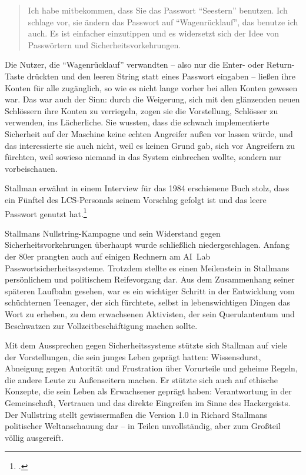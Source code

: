 \begin{quote}
Ich habe mitbekommen, dass Sie das Passwort "`Seestern"' benutzen. Ich schlage vor, sie ändern das Passwort auf "`Wagenrücklauf"', das benutze ich auch. Es ist einfacher einzutippen und es widersetzt sich der Idee von Passwörtern und Sicherheitsvorkehrungen.
\end{quote}

Die Nutzer, die "`Wagenrücklauf"' verwandten – also nur die Enter- oder Return-Taste drückten und den leeren String statt eines Passwort eingaben – ließen ihre Konten für alle zugänglich, so wie es nicht lange vorher bei allen Konten gewesen war. Das war auch der Sinn: durch die Weigerung, sich mit den glänzenden neuen Schlössern ihre Konten zu verriegeln, zogen sie die Vorstellung, Schlösser zu verwenden, ins Lächerliche. Sie wussten, dass die schwach implementierte Sicherheit auf der Maschine keine echten Angreifer außen vor lassen würde, und das interessierte sie auch nicht, weil es keinen Grund gab, sich vor Angreifern zu fürchten, weil sowieso niemand in das System einbrechen wollte, sondern nur vorbeischauen.

Stallman erwähnt in einem Interview für das 1984 erschienene Buch  stolz, dass ein Fünftel des LCS-Personals seinem Vorschlag gefolgt ist und das leere Passwort genutzt hat.\footcite[Vgl.][S.\,417]{hackers}

Stallmans Nullstring-Kampagne und sein Widerstand gegen Sicherheitsvorkehrungen überhaupt wurde schließlich niedergeschlagen. Anfang der 80er prangten auch auf einigen Rechnern am AI~Lab Passwortsicherheitssysteme. Trotzdem stellte es einen Meilenstein in Stallmans persönlichem und politischem Reifevorgang dar. Aus dem Zusammenhang seiner späteren Laufbahn gesehen, war es ein wichtiger Schritt in der Entwicklung vom schüchternen Teenager, der sich fürchtete, selbst in lebenswichtigen Dingen das Wort zu erheben, zu dem erwachsenen Aktivisten, der sein Querulantentum und Beschwatzen zur Vollzeitbeschäftigung machen sollte.

Mit dem Aussprechen gegen Sicherheitssysteme stützte sich Stallman auf viele der Vorstellungen, die sein junges Leben geprägt hatten: Wissensdurst, Abneigung gegen Autorität und Frustration über Vorurteile und geheime Regeln, die andere Leute zu Außenseitern machen. Er stützte sich auch auf ethische Konzepte, die sein Leben als Erwachsener geprägt haben: Verantwortung in der Gemeinschaft, Vertrauen und das direkte Eingreifen im Sinne des Hackergeists. Der Nullstring stellt gewissermaßen die Version 1.0 in Richard Stallmans politischer Weltanschauung dar – in Teilen unvollständig, aber zum Großteil völlig ausgereift.

